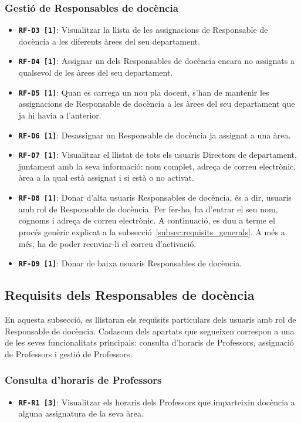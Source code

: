 \documentclass[a4paper,12pt]{ThesisStyle}
\begin{document}
\subsubsection{Gestió de Responsables de docència}
\begin{itemize}
  \item \texttt{\textbf{RF-D3 [1]}}: Visualitzar la llista de les assignacions de Responsable de docència a les diferents àrees del seu departament.
  \item \texttt{\textbf{RF-D4 [1]}}: Assignar un dels Responsables de docència encara no assignats a qualsevol de les àrees del seu departament.
  \item \texttt{\textbf{RF-D5 [1]}}: Quan es carrega un nou pla docent, s'han de mantenir les assignacions de Responsable de docència a les àrees del seu departament que ja hi havia a l'anterior.
  \item \texttt{\textbf{RF-D6 [1]}}: Desassignar un Responsable de docència ja assignat a una àrea.
  \item \texttt{\textbf{RF-D7 [1]}}: Visualitzar el llistat de tots els usuaris Directors de departament, juntament amb la seva informació: nom complet, adreça de correu electrònic, àrea a la qual està assignat i si està o no activat.
  \item \texttt{\textbf{RF-D8 [1]}}: Donar d'alta usuaris Responsables de docència, és a dir, usuaris amb rol de Responsable de docència. Per fer-ho, ha d'entrar el seu nom, cognoms i adreça de correu electrònic. A continuació, es duu a terme el procés genèric explicat a la subsecció~\ref{subsec:requisits_generals}. A més a més, ha de poder reenviar-li el correu d'activació.
  \item \texttt{\textbf{RF-D9 [1]}}: Donar de baixa usuaris Responsables de docència.
\end{itemize}

\subsection{Requisits dels Responsables de docència}
\label{subsec:requisits_responsables_docencia}

En aquesta subsecció, es llistaran els requisits particulars dels usuaris amb rol de Responsable de docència. Cadascun dels apartats que segueixen correspon a una de les seves funcionalitats principals: consulta d'horaris de Professors, assignació de Professors i gestió de Professors.

\subsubsection{Consulta d'horaris de Professors}
\begin{itemize}
  \item \texttt{\textbf{RF-R1 [3]}}: Visualitzar els horaris dels Professors que imparteixin docència a alguna assignatura de la seva àrea.
\end{itemize}
\end{document}
